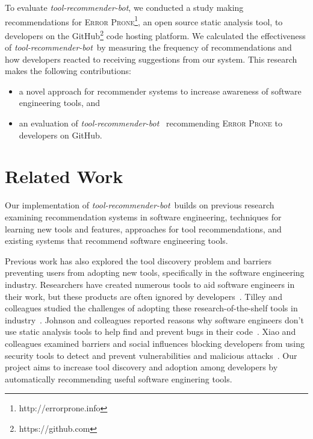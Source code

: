 \documentclass[sigconf,review,anonymous]{acmart}
\newcommand{\tool}{\textsl{tool-recommender-bot}}
\begin{document}
To evaluate \tool, we conducted a study making recommendations for \textsc{Error Prone}\footnote{http://errorprone.info}, an open source static analysis tool, to developers on the GitHub\footnote{https://github.com} code hosting platform. We calculated the effectiveness of \tool~by measuring the frequency of recommendations and how developers reacted to receiving suggestions from our system. This research makes the following contributions:

\begin{itemize}
 \item a novel approach for recommender systems to increase awareness of software engineering tools, and
 \item an evaluation of \tool~ recommending \textsc{Error Prone} to developers on GitHub.
 \end{itemize}

\section{Related Work}
Our implementation of \tool~builds on previous research examining recommendation systems in software engineering, techniques for learning new tools and features, approaches for tool recommendations, and existing systems that recommend software engineering tools.

Previous work has also explored the tool discovery problem and barriers preventing users from adopting new tools, specifically in the software engineering industry. Researchers have created numerous tools to aid software engineers in their work, but these products are often ignored by developers~\cite{Ivanov2017Gaps}. Tilley and colleagues studied the challenges of adopting these research-of-the-shelf tools in industry~\cite{Tilley2003ROTS}. Johnson and colleagues reported reasons why software engineers don't use static analysis tools to help find and prevent bugs in their code~\cite{Johnson2013Why}. Xiao and colleagues examined barriers and social influences blocking developers from using security tools to detect and prevent vulnerabilities and malicious attacks~\cite{Xiao2014Security}. Our project aims to increase tool discovery and adoption among developers by automatically recommending useful software enginering tools.
\end{document}
